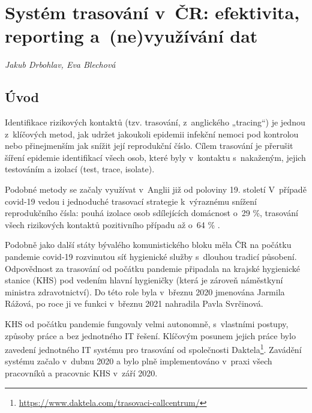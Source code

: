\chapter[Systém trasování v~ČR]{Systém trasování v~ČR: efektivita, reporting a~(ne)využívání dat}\label{Trasovani}

\textit{Jakub Drbohlav, Eva Blechová}
\vspace{15mm}
\vspace{-1eM}

\section*{Úvod}

Identifikace rizikových kontaktů (tzv. trasování, z~anglického „tracing“) je jednou z~klíčových metod, jak udržet jakoukoli epidemii infekční nemoci pod kontrolou nebo přinejmenším jak snížit její reprodukční číslo. Cílem trasování je přerušit šíření epidemie identifikací všech osob, které byly v~kontaktu s~nakaženým, jejich testováním a izolací (test, trace, isolate).

Podobné metody se začaly využívat v~Anglii již od poloviny 19. století \cite{pg:mooney2020} V~případě covid-19 vedou i jednoduché trasovací strategie k~výraznému snížení reprodukčního čísla: pouhá izolace osob sdílejících domácnost o~29 \%, trasování všech rizikových kontaktů pozitivního případu až o~64 \% \cite{pg:kucharski2020}.

Podobně jako další státy bývalého komunistického bloku měla ČR na počátku pandemie covid-19 rozvinutou síť hygienické služby s~dlouhou tradicí působení. Odpovědnost za trasování od počátku pandemie připadala na krajské hygienické stanice (KHS) pod vedením hlavní hygieničky (která je zároveň náměstkyní ministra zdravotnictví). Do této role byla v~březnu 2020 jmenována Jarmila Rážová, po roce ji ve funkci v~březnu 2021 nahradila Pavla Svrčinová.

KHS od počátku pandemie fungovaly velmi autonomně, s~vlastními postupy, způsoby práce a bez jednotného IT řešení. Klíčovým posunem jejich práce bylo zavedení jednotného IT systému pro trasování od společnosti Daktela\footnote{\url{https://www.daktela.com/trasovaci-callcentrum/}}. Zavádění systému začalo v~dubnu 2020 a bylo plně implementováno v~praxi všech pracovníků a pracovnic KHS v~září 2020.

